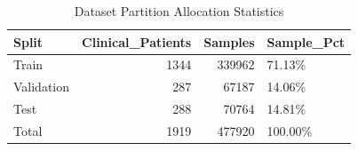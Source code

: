 \begin{table}
\caption{Dataset Partition Allocation Statistics}
\label{tab:table_split_statistics}
\begin{tabular}{lrrl}
\toprule
Split & Clinical\_Patients & Samples & Sample\_Pct \\
\midrule
Train & 1344 & 339962 & 71.13\% \\
Validation & 287 & 67187 & 14.06\% \\
Test & 288 & 70764 & 14.81\% \\
Total & 1919 & 477920 & 100.00\% \\
\bottomrule
\end{tabular}
\end{table}
